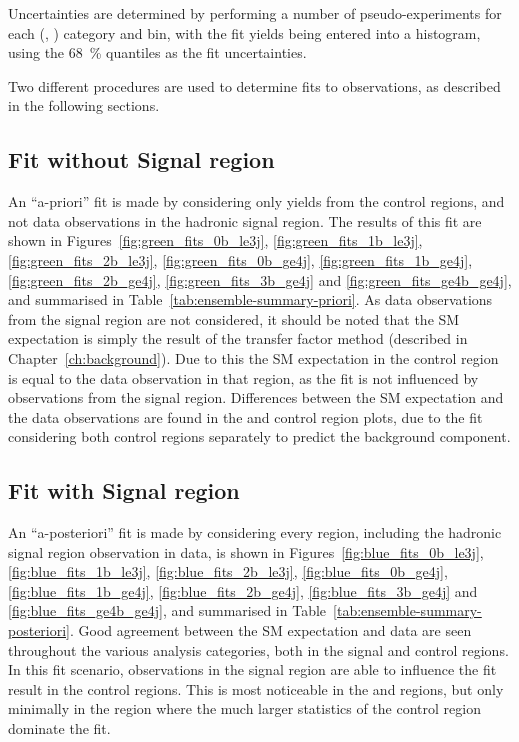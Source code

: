 Uncertainties are determined by performing a number of pseudo-experiments for
each (\nb, \nj) category and \HT bin, with the fit yields being entered into a
histogram, using the 68~\% quantiles as the fit uncertainties.

Two different procedures are used to determine fits to observations, as described
in the following sections.

\subsection{Fit without Signal region}
\label{sec:results_fit_green}
An ``a-priori'' fit is made by considering only yields from the control regions,
and not data observations in the hadronic signal region. The results of this fit
are shown in Figures~\ref{fig:green_fits_0b_le3j}, \ref{fig:green_fits_1b_le3j}, \ref{fig:green_fits_2b_le3j}, \ref{fig:green_fits_0b_ge4j}, \ref{fig:green_fits_1b_ge4j}, \ref{fig:green_fits_2b_ge4j}, \ref{fig:green_fits_3b_ge4j} and \ref{fig:green_fits_ge4b_ge4j},
and summarised in Table~\ref{tab:ensemble-summary-priori}. As data
observations from the signal region are not considered, it should be noted that
the SM expectation is simply the result of the transfer factor method
(described in Chapter~\ref{ch:background}). Due to this the SM expectation in
the \mj control region is equal to the data observation in
that region, as the fit is not influenced by observations from the signal region.
Differences between the SM expectation and the data observations are found in the
\mmj and \gj control region plots, due to the fit considering both control regions
separately to predict the \zinv background component.

\subsection{Fit with Signal region}
\label{sec:results_fit_blue}
An ``a-posteriori'' fit is made by considering every region, including the
hadronic signal region observation in data, is shown in
Figures~\ref{fig:blue_fits_0b_le3j}, \ref{fig:blue_fits_1b_le3j}, \ref{fig:blue_fits_2b_le3j}, \ref{fig:blue_fits_0b_ge4j}, \ref{fig:blue_fits_1b_ge4j}, \ref{fig:blue_fits_2b_ge4j}, \ref{fig:blue_fits_3b_ge4j} and \ref{fig:blue_fits_ge4b_ge4j},
and summarised in Table~\ref{tab:ensemble-summary-posteriori}. Good agreement
between the SM expectation and data are seen throughout the various analysis
categories, both in the signal and control regions. In this fit scenario,
observations in the signal region are able to influence the
fit result in the control regions. This is most noticeable in the \mmj and \gj regions,
but only minimally in the \mj region where the much larger statistics of
the control region dominate the fit.

